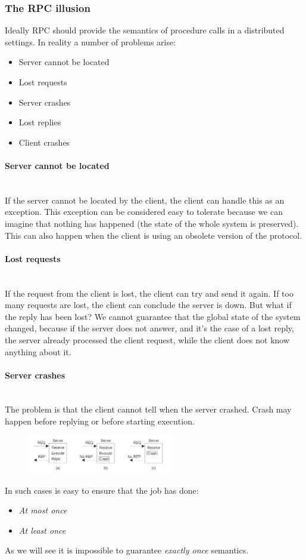 \documentclass[10pt,a4paper]{article}
\newcommand{\myparagraph}[1]{\paragraph{#1}\mbox{}\\[0.05in]}
\begin{document}
\subsubsection{The RPC illusion}
Ideally RPC should provide the semantics of procedure calls in a distributed settings. In reality a number of problems arise:
\begin{itemize}
	\item Server cannot be located
	\item Lost requests
	\item Server crashes
	\item Lost replies
	\item Client crashes
\end{itemize}
\myparagraph{Server cannot be located}
If the server cannot be located by the client, the client can handle this as an exception. This exception can be considered easy to tolerate because we can imagine that nothing has happened (the state of the whole system is preserved). This can also happen when the client is using an obsolete version of the protocol.
\myparagraph{Lost requests}
If the request from the client is lost, the client can try and send it again. If too many requests are lost, the client can conclude the server is down. But what if the reply has been lost? We cannot guarantee that the global state of the system changed, because if the server does not answer, and it's the case of a lost reply,  the server already processed the client request, while the client does not know anything about it. \pagebreak
\myparagraph{Server crashes}
The problem is that the client cannot tell when the server crashed. Crash may happen before replying or before starting execution.
\begin{figure}[h!]
\hfill \includegraphics[width=180pt]{images/server-crash.png}\hspace*{\fill}
  \label{fig:server-crash}
\end{figure}
In such cases is easy to ensure that the job has done:
\begin{itemize}
	\item \textit{At most once}
	\item \textit{At least once}
\end{itemize}
As we will see it is impossible to guarantee \textit{exactly once} semantics. \\ \\
\end{document}

